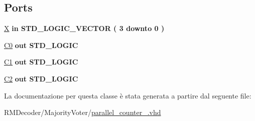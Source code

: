\subsection*{Ports}
 \begin{DoxyCompactItemize}
\item 
\hypertarget{classparallel__counter__4_gad166bdfb934fb9b5f9d934bc77e58e21}{\hyperlink{group___majority_voter_gad166bdfb934fb9b5f9d934bc77e58e21}{X}  {\bfseries {\bfseries \textcolor{vhdlchar}{in}\textcolor{vhdlchar}{ }}} {\bfseries \textcolor{vhdlchar}{S\+T\+D\+\_\+\+L\+O\+G\+I\+C\+\_\+\+V\+E\+C\+T\+O\+R}\textcolor{vhdlchar}{ }\textcolor{vhdlchar}{(}\textcolor{vhdlchar}{ }\textcolor{vhdlchar}{ } \textcolor{vhdldigit}{3} \textcolor{vhdlchar}{ }\textcolor{vhdlchar}{downto}\textcolor{vhdlchar}{ }\textcolor{vhdlchar}{ } \textcolor{vhdldigit}{0} \textcolor{vhdlchar}{ }\textcolor{vhdlchar}{)}\textcolor{vhdlchar}{ }} }\label{classparallel__counter__4_gad166bdfb934fb9b5f9d934bc77e58e21}

\item 
\hypertarget{classparallel__counter__4_ga6f34466d04aa5a2a4a3313b99753df61}{\hyperlink{group___majority_voter_ga6f34466d04aa5a2a4a3313b99753df61}{C0}  {\bfseries {\bfseries \textcolor{vhdlchar}{out}\textcolor{vhdlchar}{ }}} {\bfseries \textcolor{vhdlchar}{S\+T\+D\+\_\+\+L\+O\+G\+I\+C}\textcolor{vhdlchar}{ }} }\label{classparallel__counter__4_ga6f34466d04aa5a2a4a3313b99753df61}

\item 
\hypertarget{classparallel__counter__4_gaf3a15fc1c76ca3d55f4c8d227d190085}{\hyperlink{group___majority_voter_gaf3a15fc1c76ca3d55f4c8d227d190085}{C1}  {\bfseries {\bfseries \textcolor{vhdlchar}{out}\textcolor{vhdlchar}{ }}} {\bfseries \textcolor{vhdlchar}{S\+T\+D\+\_\+\+L\+O\+G\+I\+C}\textcolor{vhdlchar}{ }} }\label{classparallel__counter__4_gaf3a15fc1c76ca3d55f4c8d227d190085}

\item 
\hypertarget{classparallel__counter__4_gafcc18913336fb764fc05b7d7e4753946}{\hyperlink{group___majority_voter_gafcc18913336fb764fc05b7d7e4753946}{C2}  {\bfseries {\bfseries \textcolor{vhdlchar}{out}\textcolor{vhdlchar}{ }}} {\bfseries \textcolor{vhdlchar}{S\+T\+D\+\_\+\+L\+O\+G\+I\+C}\textcolor{vhdlchar}{ }} }\label{classparallel__counter__4_gafcc18913336fb764fc05b7d7e4753946}

\end{DoxyCompactItemize}


La documentazione per questa classe è stata generata a partire dal seguente file\+:\begin{DoxyCompactItemize}
\item 
R\+M\+Decoder/\+Majority\+Voter/\hyperlink{parallel__counter__4_8vhd}{parallel\+\_\+counter\+\_.\+vhd}\end{DoxyCompactItemize}
